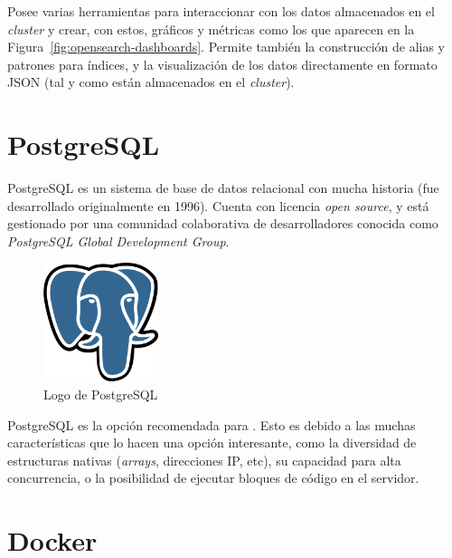 Posee varias herramientas para interaccionar con los datos almacenados en el \emph{cluster} y crear, con estos, gráficos y métricas como los que aparecen en la Figura~\ref{fig:opensearch-dashboards}. Permite también la construcción de alias y patrones para índices, y la visualización de los datos directamente en formato JSON (tal y como están almacenados en el \emph{cluster}).


\section{PostgreSQL}

PostgreSQL es un sistema de base de datos relacional con mucha historia (fue desarrollado originalmente en 1996). Cuenta con licencia \emph{open source}, y está gestionado por una comunidad colaborativa de desarrolladores conocida como \emph{PostgreSQL Global Development Group}. \emph{\parencite{Reference19}}

\begin{figure}[ht]
    \centering
    \includegraphics[width=0.3\textwidth]{Figures/postgresql-logo}
    \decoRule
    \caption[PostgreSQL (Logo)]{Logo de PostgreSQL \emph{\parencite{Reference19}}}
    \label{fig:postgresql-logo}
\end{figure}

PostgreSQL es la opción recomendada para . Esto es debido a las muchas características que lo hacen una opción interesante, como la diversidad de estructuras nativas (\emph{arrays}, direcciones IP, etc), su capacidad para alta concurrencia, o la posibilidad de ejecutar bloques de código en el servidor.


\section{Docker}\label{sec:docker}

